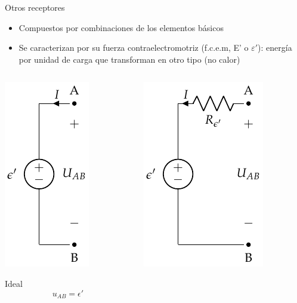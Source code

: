 \documentclass[aspectratio=169, xcolor={usenames,svgnames,dvipsnames}]{beamer}
\begin{document}
\begin{frame}{Otros receptores}
\begin{itemize}
    \item Compuestos por combinaciones de los elementos básicos
    \item Se caracterizan por su \alert{fuerza contraelectromotriz} (f.c.e.m, E' o $\varepsilon'$): energía por unidad de carga que transforman en otro tipo (no calor)
\end{itemize}
\begin{columns}
\begin{column}{0.3\columnwidth}
\begin{center}
\includegraphics[height=0.4\textheight]{../figs/receptor_ideal.pdf}

\alert{Ideal}
\begin{equation*}
    u_{AB}=\epsilon'
\end{equation*}
\end{center}
\end{column}
\begin{column}{0.3\columnwidth}
\begin{center}
\includegraphics[height=0.4\textheight]{../figs/receptor_real.pdf}


\end{center}
\end{column}
\end{columns}
\end{frame}
\end{document}
